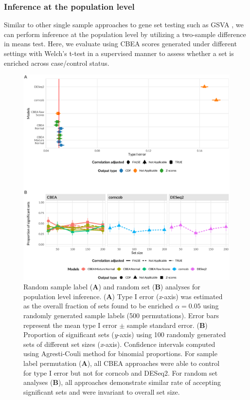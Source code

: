 \documentclass[10pt,letterpaper]{article}
\begin{document}
\subsubsection*{Inference at the population level}

Similar to other single sample approaches to gene set testing such as GSVA \cite{hanzelmann2013}, we can perform inference at the population level by utilizing a two-sample difference in means test. Here, we evaluate using CBEA scores generated under different settings with Welch's t-test in a supervised manner to assess whether a set is enriched across case/control status. 

\begin{figure}[!h]
    \centering
    \includegraphics[width = \textwidth]{figures/data_diffab_fdr.eps}
    \caption{Random sample label (\textbf{A}) and random set (\textbf{B}) analyses for population level inference. (\textbf{A}) Type I error (\emph{x}-axis) was estimated as the overall fraction of sets found to be enriched $\alpha = 0.05$ using randomly generated sample labels (500 permutations).  Error bars represent the mean type I error $\pm$ sample standard error. (\textbf{B}) Proportion of significant sets (\emph{y}-axis) using 100 randomly generated sets of different set sizes (\emph{x}-axis). Confidence intervals computed using Agresti-Couli method for binomial proportions. For sample label permutation (\textbf{A}), all CBEA approaches were able to control for type I error but not for corncob and DESeq2. For random set analyses (\textbf{B}), all approaches demonstrate similar rate of accepting significant sets and were invariant to overall set size.}  
    \label{fig:3}
\end{figure}
\end{document}
